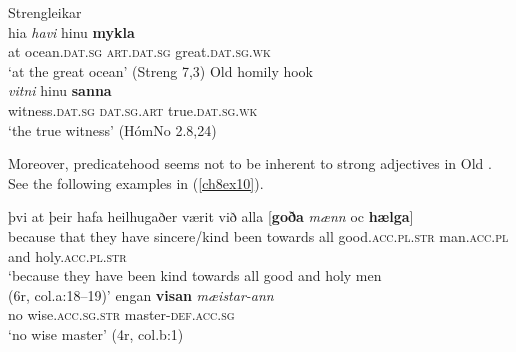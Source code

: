\documentclass[output=paper,colorlinks,citecolor=brown]{langscibook}
\begin{document}
\begin{exe}
\ex\label{ch8ex9}
\begin{xlist}
\ex\label{ch8ex9a}
Strengleikar\\
\gll  hia \textit{havi} hinu \textbf{mykla} \\
at ocean.\textsc{dat.sg} \textsc{art.dat.sg} great.\textsc{dat.sg.wk}\\
\glt `at the great ocean' (Streng 7,3)
\ex\label{ch8ex9b}
Old  homily hook\\
\gll \textit{vitni} hinu \textbf{sanna } \\
witness.\textsc{dat.sg} \textsc{dat.sg.art} true.\textsc{dat.sg.wk}\\
\glt `the true witness' (HómNo 2.8,24)
\end{xlist}
\end{exe}

Moreover, predicatehood seems not to be inherent to strong adjectives in
Old . See the following examples in (\ref{ch8ex10}).

\begin{exe}
\ex\label{ch8ex10}
\begin{xlist}
\ex\label{ch8ex10a}
\gll  þvi at þeir hafa heilhugaðer værit við alla {[}\textbf{goða} \textit{mænn} oc \textbf{hælga}{]} \\
because that they have sincere/kind been towards all good.\textsc{acc.pl.str} man.\textsc{acc.pl} and holy.\textsc{acc.pl.str} \\
\glt `because they have been kind towards all good and holy men \\ (6r, col.a:18--19)'
\ex\label{ch8ex10b}
\gll  engan \textbf{visan} \textit{mæistar-ann}\\
no wise.\textsc{acc.sg.str} master-\textsc{def.acc.sg}\\
\glt `no wise master'  (4r, col.b:1)
\end{xlist}
\end{exe}
\end{document}
